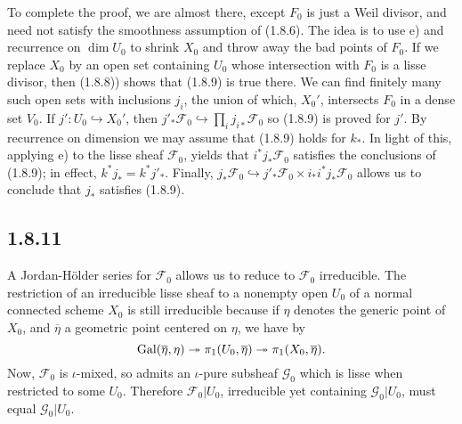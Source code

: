 \documentclass[deligne.tex]{subfiles}
\begin{document}
To complete the proof, we are almost there, except $F_0$ is just a Weil
divisor, and need not satisfy the smoothness assumption of (1.8.6).
The idea is to use e) and recurrence on $\dim U_0$ to shrink $X_0$ and 
throw away the bad points of $F_0$.
If we replace $X_0$ by an open set containing $U_0$ whose intersection with
$F_0$ is a lisse divisor, then (1.8.8)) shows that 
(1.8.9) is true there.
We can find finitely many such open sets with inclusions $j_i$, the union 
of which, $X_0'$, intersects $F_0$ in a dense set $V_0$. If
$j':U_0\hookrightarrow X_0'$, then
$j'_\ast\mathscr F_0\hookrightarrow\prod_i j_{i\ast}\mathscr F_0$ so
(1.8.9) is proved for $j'$.
By recurrence on dimension we may assume that (1.8.9) holds for $k_\ast$.
In light of this, applying e) to the lisse sheaf $\mathscr F_0$, yields 
that $i^\ast j_\ast\mathscr F_0$ satisfies the conclusions of (1.8.9); in
effect, $k^\ast j_\ast=k^\ast j'_\ast$.
Finally, $j_\ast\mathscr F_0\hookrightarrow
j'_\ast\mathscr F_0\times i_\ast i^\ast j_\ast\mathscr F_0$ allows us to
conclude that $j_\ast$ satisfies (1.8.9).

\subsection*{1.8.11} A Jordan-Hölder series for $\mathscr F_0$ allows us
to reduce to $\mathscr F_0$ irreducible.
The restriction of an irreducible lisse sheaf to a
nonempty open $U_0$ of a normal connected scheme $X_0$ is still irreducible 
because if $\eta$ denotes the generic point of $X_0$, and $\overline\eta$ a
geometric point centered on $\eta$, we have by \cite[Exp. V, 8.2]{SGA1}
\begin{equation*}
	\operatorname{Gal}(\overline\eta,\eta)\twoheadrightarrow \pi_1(U_0,\overline\eta)	\twoheadrightarrow\pi_1(X_0,\overline\eta).
\end{equation*}
Now, $\mathscr F_0$ is $\iota$-mixed, so admits an $\iota$-pure subsheaf
$\mathscr G_0$ which is lisse when restricted to some $U_0$.
Therefore $\mathscr F_0|U_0$, irreducible yet containing
$\mathscr G_0|U_0$, must equal $\mathscr G_0|U_0$.
\end{document}

